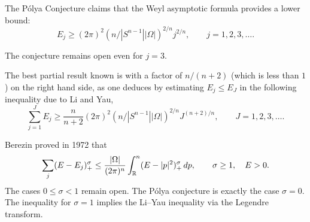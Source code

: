 \documentclass[12pt,letterpaper, reqno]{amsart}
\begin{document}
\begin{problemblock}

\begin{problem}
The P\'{o}lya Conjecture claims
that the Weyl asymptotic formula provides a lower bound:
\[
E_j \geq (2\pi)^2 (n/ |S^{n-1}| |\Omega|)^{2/n} j^{2/n} , \qquad j =
1,2,3,\ldots .
\]
\end{problem}

The conjecture remains open even for $j=3$.

\begin{remark}
The best partial result known is with a factor of $n/(n+2)$ (which
is less than $1$) on the right hand side, as one deduces by
estimating $E_j \leq E_J$ in the following inequality due to Li and Yau,
\[
\sum_{j=1}^J E_j \geq \frac{n}{n+2} (2\pi)^2 (n/ |S^{n-1}|
|\Omega|)^{2/n} J^{(n+2)/n} , \qquad J=1,2,3,\ldots .
\]
\end{remark}

\begin{remark}
Berezin proved in 1972 that
\[
\sum_j (E - E_j)_+^\sigma \leq \frac{|\Omega|}{(2\pi)^n} \int_\mathbb R^n (E
- |p|^2)_+^\sigma \, dp , \qquad \sigma \geq 1, \quad E>0.
\]
The cases $0 \leq \sigma < 1$ remain open. The P\'{o}lya conjecture is exactly the case $\sigma=0$.
The inequality for $\sigma=1$ implies the Li--Yau inequality via the Legendre transform.
\end{remark}

\end{problemblock}
\end{document}
